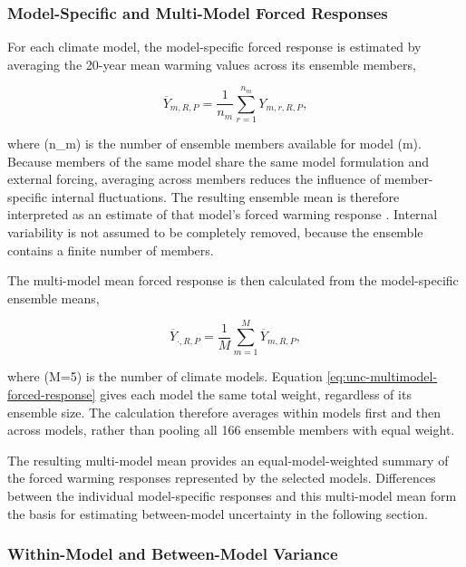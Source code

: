 \documentclass[
]{krantz}
\begin{document}
\subsubsection{Model-Specific and Multi-Model Forced Responses}\label{model-specific-and-multi-model-forced-responses}

For each climate model, the model-specific forced response is estimated by averaging the 20-year mean warming values across its ensemble members,

\begin{equation}
\overline{Y}_{m,R,P}
=
\frac{1}{n_m}
\sum_{r=1}^{n_m}
Y_{m,r,R,P},
\label{eq:unc-model-forced-response}
\end{equation}

where (n\_m) is the number of ensemble members available for model (m). Because members of the same model share the same model formulation and external forcing, averaging across members reduces the influence of member-specific internal fluctuations. The resulting ensemble mean is therefore interpreted as an estimate of that model's forced warming response \citep{Deser2020, Lehner2020}. Internal variability is not assumed to be completely removed, because the ensemble contains a finite number of members.

The multi-model mean forced response is then calculated from the model-specific ensemble means,

\begin{equation}
\overline{Y}_{\cdot,R,P}
=
\frac{1}{M}
\sum_{m=1}^{M}
\overline{Y}_{m,R,P},
\label{eq:unc-multimodel-forced-response}
\end{equation}

where (M=5) is the number of climate models. Equation \eqref{eq:unc-multimodel-forced-response} gives each model the same total weight, regardless of its ensemble size. The calculation therefore averages within models first and then across models, rather than pooling all 166 ensemble members with equal weight.

The resulting multi-model mean provides an equal-model-weighted summary of the forced warming responses represented by the selected models. Differences between the individual model-specific responses and this multi-model mean form the basis for estimating between-model uncertainty in the following section.

\subsubsection{Within-Model and Between-Model Variance}\label{within-model-and-between-model-variance}
\end{document}
